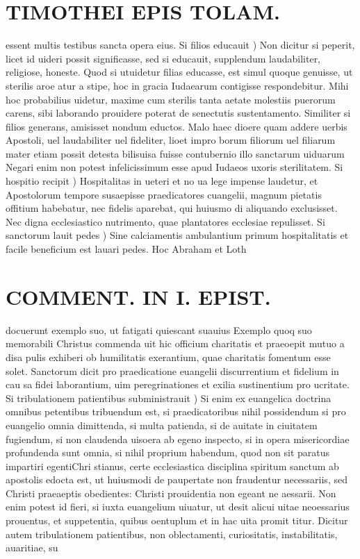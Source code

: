 \documentclass{article}
\begin{document}
\begin{pages}
\section*{TIMOTHEI EPIS TOLAM. }
\marginpar{[ p.127 ]}\pstart essent multis testibus sancta opera eius.  \pend\pstart Si filios educauit ) Non dicitur si peperit, licet id uideri possit significasse, sed si educauit, supplendum laudabiliter, religiose, honeste. Quod si utuidetur filias educasse, est simul quoque genuisse, ut sterilis aroe atur a stipe, hoc in gracia Iudaearum contigisse respondebitur. Mihi hoc probabilius uidetur, maxime cum sterilis tanta aetate molestiis puerorum carens, sibi laborando prouidere poterat de senectutis sustentamento. Similiter si filios generans, amisisset nondum eductos. Malo haec dioere quam addere uerbis Apostoli, uel laudabiliter uel fideliter, lioet impro borum filiorum uel filiarum mater etiam possit detesta bilisuisa fuisse contubernio illo sanctarum uiduarum Negari enim non potest infelicissimum esse apud Iudaeos uxoris sterilitatem.  \pend\pstart Si hospitio recipit ) Hospitalitas in ueteri et no ua lege impense laudetur, et Apostolorum tempore susaepisse praedicatores cuangelii, magnum pietatis offitium habebatur, nec fidelis aparebat, qui huiusmo di aliquando exclusisset. Nec digna ecclesiastico nutrimento, quae plantatores ecclesiae repulisset.  \pend\pstart Si sanctorum lauit pedes ) Sine calciamentis ambulantium primum hospitalitatis et facile beneficium est lauari pedes. Hoc Abraham et Loth  \pend
\section*{COMMENT. IN I. EPIST. }
\marginpar{[ p.128 ]}\pstart docuerunt exemplo suo, ut fatigati quiescant suauius Exemplo quoq suo memorabili Christus commenda uit hic officium charitatis et praeoepit mutuo a disa pulis exhiberi ob humilitatis exerantium, quae charitatis fomentum esse solet. Sanctorum dicit pro praedicatione euangelii discurrentium et fidelium in cau sa fidei laborantium, uim peregrinationes et exilia sustinentium pro ucritate.  \pend\pstart Si tribulationem patientibus subministrauit ) Si enim ex euangelica doctrina omnibus petentibus tribuendum est, si praedicatoribus nihil possidendum si pro euangelio omnia dimittenda, si multa patienda, si de auitate in ciuitatem fugiendum, si non claudenda uisoera ab egeno inspecto, si in opera misericordiae profundenda sunt omnia, si nihil proprium habendum, quod non sit paratus impartiri egentiChri stianus, certe ecclesiastica disciplina spiritum sanctum ab apostolis edocta est, ut huiusmodi de paupertate non fraudentur necessariis, sed Christi praeaeptis obedientes: Christi prouidentia non egeant ne aessarii. Non enim potest id fieri, si iuxta euangelium uiuatur, ut desit alicui uitae neoessarius prouentus, et suppetentia, quibus oentuplum et in hac uita promit titur. Dicitur autem tribulationem patientibus, non oblectamenti, curiositatis, instabilitatis, auaritiae, su\pend

\end{pages}
\end{document}
